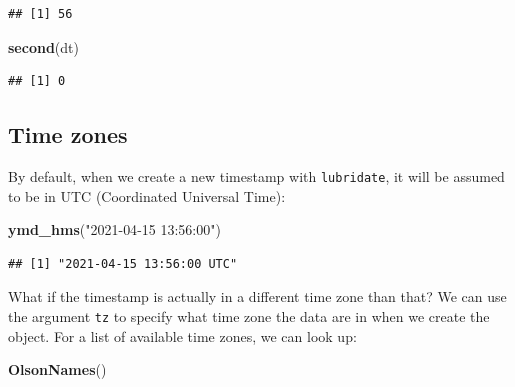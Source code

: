 \documentclass[
]{book}
\newenvironment{Shaded}{\begin{snugshade}}{\end{snugshade}}
\newcommand{\FunctionTok}[1]{\textcolor[rgb]{0.13,0.29,0.53}{\textbf{#1}}}
\newcommand{\NormalTok}[1]{#1}
\newcommand{\StringTok}[1]{\textcolor[rgb]{0.31,0.60,0.02}{#1}}
\begin{document}
\begin{verbatim}
## [1] 56
\end{verbatim}

\begin{Shaded}
\begin{Highlighting}[]
\FunctionTok{second}\NormalTok{(dt)}
\end{Highlighting}
\end{Shaded}

\begin{verbatim}
## [1] 0
\end{verbatim}

\hypertarget{time-zones}{%
\subsection{Time zones}\label{time-zones}}

By default, when we create a new timestamp with \texttt{lubridate}, it will be assumed to be in UTC (Coordinated Universal Time):

\begin{Shaded}
\begin{Highlighting}[]
\FunctionTok{ymd\_hms}\NormalTok{(}\StringTok{"2021{-}04{-}15 13:56:00"}\NormalTok{)}
\end{Highlighting}
\end{Shaded}

\begin{verbatim}
## [1] "2021-04-15 13:56:00 UTC"
\end{verbatim}

What if the timestamp is actually in a different time zone than that? We can use the argument \texttt{tz} to specify what time zone the data are in when we create the object. For a list of available time zones, we can look up:

\begin{Shaded}
\begin{Highlighting}[]
\FunctionTok{OlsonNames}\NormalTok{()}
\end{Highlighting}
\end{Shaded}
\end{document}
